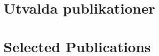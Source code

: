 \else

    \ifswedish

        \section{Utvalda publikationer}

    \else

        \section{Selected Publications}

    \fi

    \begin{refsection}
        \nocite{
            GironsLopez2017,
            GironsLopez2016a,
            GironsLopez2015
        }
        \printbibliography[heading=none]
    \end{refsection}

\fi

